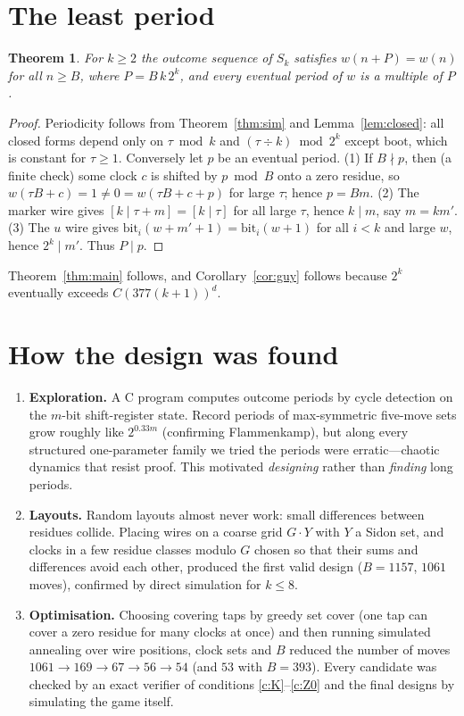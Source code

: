 \documentclass[11pt]{article}
\newtheorem{theorem}{Theorem}
\theoremstyle{definition}
\begin{document}
\section{The least period}

\begin{theorem}\label{thm:period}
For $k\ge2$ the outcome sequence of $S_k$ satisfies $w(n+P)=w(n)$ for all $n\ge B$, where
$P=B\,k\,2^k$, and every eventual period of $w$ is a multiple of $P$.
\end{theorem}

\begin{proof}
Periodicity follows from Theorem~\ref{thm:sim} and Lemma~\ref{lem:closed}: all closed forms depend
only on $\tau\bmod k$ and $(\tau\div k)\bmod 2^k$ except $\mathrm{boot}$, which is constant for
$\tau\ge1$.  Conversely let $p$ be an eventual period.
(1) If $B\nmid p$, then (a finite check) some clock $c$ is shifted by $p\bmod B$ onto a zero residue,
so $w(\tau B+c)=1\neq 0=w(\tau B+c+p)$ for large $\tau$; hence $p=Bm$.
(2) The marker wire gives $[k\mid \tau+m]=[k\mid\tau]$ for all large $\tau$, hence $k\mid m$, say
$m=km'$.
(3) The $u$ wire gives $\mathrm{bit}_i(w+m'+1)=\mathrm{bit}_i(w+1)$ for all $i<k$ and large $w$,
hence $2^k\mid m'$.  Thus $P\mid p$.
\end{proof}

Theorem~\ref{thm:main} follows, and Corollary~\ref{cor:guy} follows because $2^k$ eventually
exceeds $C(377(k+1))^d$.

\section{How the design was found}\label{sec:search}

\begin{enumerate}[leftmargin=*]
\item \textbf{Exploration.}  A C program computes outcome periods by cycle detection on the
$m$-bit shift-register state.  Record periods of max-symmetric five-move sets grow roughly like
$2^{0.33m}$ (confirming Flammenkamp), but along every structured one-parameter family we tried the
periods were erratic---chaotic dynamics that resist proof.  This motivated \emph{designing} rather
than \emph{finding} long periods.
\item \textbf{Layouts.}  Random layouts almost never work: small differences between residues
collide.  Placing wires on a coarse grid $G\cdot Y$ with $Y$ a Sidon set, and clocks in a few
residue classes modulo $G$ chosen so that their sums and differences avoid each other, produced the
first valid design ($B=1157$, $1061$ moves), confirmed by direct simulation for $k\le 8$.
\item \textbf{Optimisation.}  Choosing covering taps by greedy set cover (one tap can cover a zero
residue for many clocks at once) and then running simulated annealing over wire positions, clock
sets and $B$ reduced the number of moves $1061\to169\to 67\to 56\to 54$ (and $53$ with $B=393$).
Every candidate was checked by an exact verifier of conditions \ref{c:K}--\ref{c:Z0} and the final
designs by simulating the game itself.
\end{enumerate}
\end{document}
